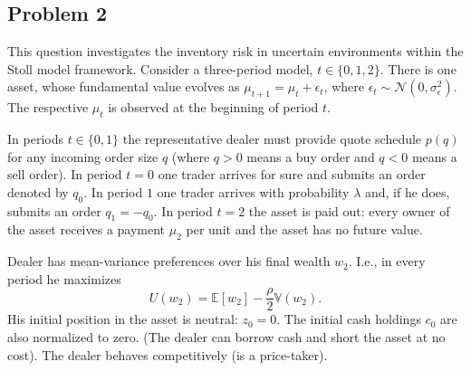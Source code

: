 \quad
\subsection*{Problem 2}

This question investigates the inventory risk in uncertain environments within the Stoll model framework. Consider a three-period model, $t \in \{0,1,2\}$. There is one asset, whose fundamental value evolves as $\mu_{t+1} = \mu_t + \epsilon_t$, where $\epsilon_t \sim \mathcal{N}(0,\sigma_\epsilon^2)$. The respective $\mu_t$ is observed at the beginning of period $t$.

In periods $t \in \{0,1\}$ the representative dealer must provide quote schedule $p(q)$ for any incoming order size $q$ (where $q>0$ means a buy order and $q<0$ means a sell order). In period $t=0$ one trader arrives for sure and submits an order denoted by $q_0$. In period $1$ one trader arrives with probability $\lambda$ and, if he does, submits an order $q_1 = -q_0$. In period $t=2$ the asset is paid out: every owner of the asset receives a payment $\mu_2$ per unit and the asset has no future value.

Dealer has mean-variance preferences over his final wealth $w_2$. I.e., in every period he maximizes
\[ U(w_2) = \mathbb{E}[w_2] - \frac{\rho}{2} \mathbb{V}(w_2). \]
His initial position in the asset is neutral: $z_0=0$. The initial cash holdings $c_0$ are also normalized to zero. (The dealer can borrow cash and short the asset at no cost). The dealer behaves competitively (is a price-taker).

